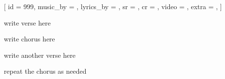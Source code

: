 [
    id          = {999},
    music_by    = {},
    lyrics_by   = {},
    sr          = {},
    cr          = {},
    video       = {},
    extra       = {},
]

\beginverse
write verse here
\endverse

\beginchorus
write chorus here
\endchorus

\beginverse
write another verse here
\endverse

\beginchorus
repeat the chorus as needed
\endchorus

\endsong
